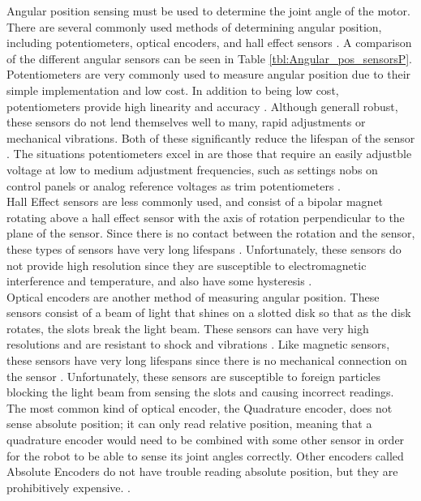 Angular position sensing must be used to determine the joint angle of the motor. There are several commonly used methods of determining angular position, including potentiometers, optical encoders, and hall effect sensors \cite{Pot_vs_Sensor,Choose_Sensor_Technology,Choose_Position_Sensor}. A comparison of the different angular sensors can be seen in Table \ref{tbl:Angular_pos_sensorsP}. \\
\newline
Potentiometers are very commonly used to measure angular position due to their simple implementation and low cost. In addition to being low cost, potentiometers provide high linearity and accuracy \cite{Choose_Position_Sensor}. Although generall robust, these sensors do not lend themselves well to many, rapid adjustments or mechanical vibrations. Both of these significantly reduce the lifespan of the sensor \cite{Pot_vs_Sensor,Choose_Position_Sensor}. The situations potentiometers excel in are those that require an easily adjustble voltage at low to medium adjustment frequencies, such as settings nobs on control panels or analog reference voltages as trim potentiometers \cite{Pot_vs_Sensor}. \\
\newline
Hall Effect sensors are less commonly used, and consist of a bipolar magnet rotating above a hall effect sensor with the axis of rotation perpendicular to the plane of the sensor. Since there is no contact between the rotation and the sensor, these types of sensors have very long lifespans \cite{Pot_vs_Sensor}. Unfortunately, these sensors do not provide high resolution since they are susceptible to electromagnetic interference and temperature, and also have some hysteresis \cite{Choose_Position_Sensor}. \\
\newline
Optical encoders are another method of measuring angular position. These sensors consist of a beam of light that shines on a slotted disk so that as the disk rotates, the slots break the light beam. These sensors can have very high resolutions and are resistant to shock and vibrations \cite{Choose_Sensor_Technology}. Like magnetic sensors, these sensors have very long lifespans since there is no mechanical connection on the sensor \cite{Pot_vs_Sensor}. Unfortunately, these sensors are susceptible to foreign particles blocking the light beam from sensing the slots and causing incorrect readings. The most common kind of optical encoder, the Quadrature encoder, does not sense absolute position; it can only read relative position, meaning that a quadrature encoder would need to be combined with some other sensor in order for the robot to be able to sense its joint angles correctly. Other encoders called Absolute Encoders do not have trouble reading absolute position, but they are prohibitively expensive. \cite{Choose_Position_Sensor}. 

